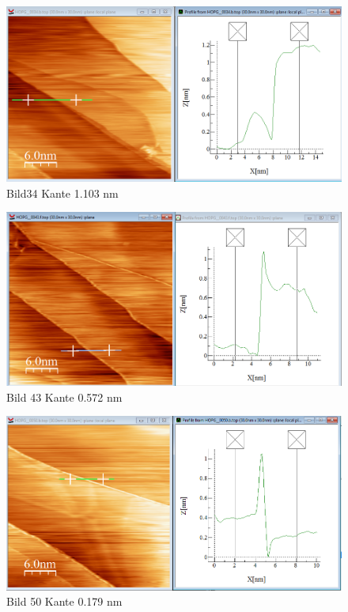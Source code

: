 \documentclass[10pt,a4paper]{article}
\begin{document}
\begin{figure}[]
	\includegraphics[scale = 0.2]{bild34.png}
	\centering
	\caption{Bild34 Kante 1.103 nm}
	\label{b34}
\end{figure}


\begin{figure}[]
	\includegraphics[scale = 0.2]{bild43.png}
	\centering
	\caption{Bild 43 Kante 0.572 nm}
	\label{b43}
\end{figure}

\begin{figure}[]
	\includegraphics[scale = 0.2]{bild50.png}
	\centering
	\caption{Bild 50 Kante 0.179 nm}
	\label{b50}
\end{figure}
\end{document}

